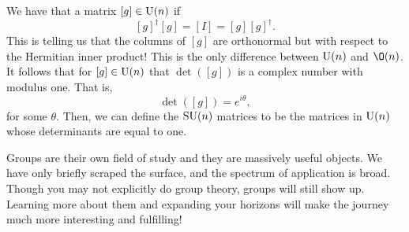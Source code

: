             We have that a matrix $[g]\in \mathrm{U}(n)$ if 
            \[
            [g]^\dagger [g] = [I] = [g][g]^\dagger.  
            \]
            This is telling us that the columns of $[g]$ are orthonormal but with respect to the Hermitian inner product!  This is the only difference between $\mathrm{U}(n)$ and $\O(n)$.  It follows that for $[g]\in \mathrm{U}(n)$ that
            $\det([g])$ is a complex number with modulus one. That is,
            \[
            \det([g])=e^{i\theta},
            \]
            for some $\theta$.  Then, we can define the $\mathrm{SU}(n)$ matrices to be the matrices in $\mathrm{U}(n)$ whose determinants are equal to one. 
            
            Groups are their own field of study and they are massively useful objects. We have only briefly scraped the surface, and the spectrum of application is broad. Though you may not explicitly do group theory, groups will still show up. Learning more about them and expanding your horizons will make the journey much more interesting and fulfilling!
            
            
